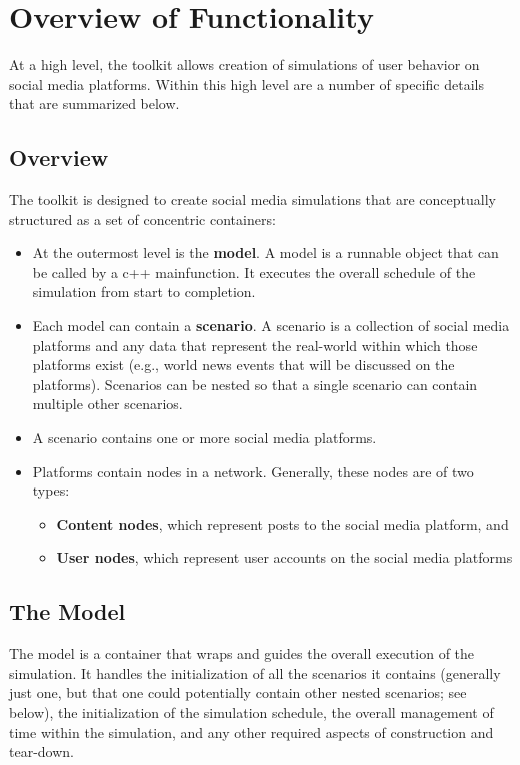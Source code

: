 
\chapter{Overview of Functionality} \label{chap:OverviewOfFunctionality}

At a high level, the \rhpc toolkit allows creation of simulations of user behavior on social media platforms. Within this high level are a number of specific details that are summarized below.

\section{Overview}
The \rhpc toolkit is designed to create social media simulations that are conceptually structured as a set of concentric containers:

\begin{itemize}
\item At the outermost level is the \textbf{model}. A model is a runnable object that can be called by a c++ mainfunction. It executes the overall schedule of the simulation from start to completion.
\item Each model can contain a \textbf{scenario}. A scenario is a collection of social media platforms and any data that represent the real-world within which those platforms exist (e.g., world news events that will be discussed on the platforms). Scenarios can be nested so that a single scenario can contain multiple other scenarios.
\item A scenario contains one or more social media platforms.
\item Platforms contain nodes in a network. Generally, these nodes are of two types:
\begin{itemize}
   \item \textbf{Content nodes}, which represent posts to the social media platform, and
   \item \textbf{User nodes}, which represent user accounts on the social media platforms
\end{itemize}
\end{itemize}


\section{The Model}
The model is a container that wraps and guides the overall execution of the simulation. It handles the initialization of all the scenarios it contains (generally just one, but that one could potentially contain other nested scenarios; see below), the initialization of the simulation schedule, the overall management of time within the simulation, and any other required aspects of construction and tear-down.

